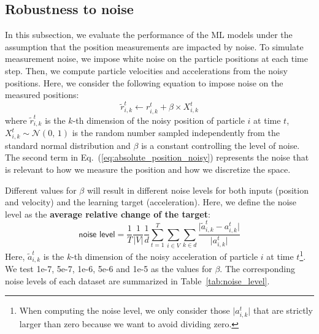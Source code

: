 \documentclass{article}
\newcommand{\abs}[1]{\lvert #1 \rvert}
\begin{document}
\clearpage







\subsection{Robustness to noise}
\label{sec:noisy_input_experiments}

In this subsection, we evaluate the performance of the ML models under the assumption that the position measurements are impacted by noise. To simulate measurement noise, we impose white noise on the particle positions at each time step. Then, we compute particle velocities and accelerations from the noisy positions. Here, we consider the following equation to impose noise on the measured positions:
\begin{equation}
\label{eq:absolute_position_noisy}
    {\tilde{r}}_{i,k}^t \leftarrow {r}_{i, k}^t + {\beta \times X_{i, k}^t}
\end{equation}
where ${\tilde{r}}_{i, k}^t$ is the $k$-th dimension of the noisy position of particle $i$ at time $t$, $X_{i, k}^t\sim \mathcal{N}(0,\,1)$ is the random number sampled independently from the standard normal distribution and $\beta$ is a constant controlling the level of noise. The second term in Eq.~(\ref{eq:absolute_position_noisy}) represents the noise that is relevant to how we measure the position and how we discretize the space.

Different values for $\beta$ will result in different noise levels for both inputs (position and velocity) and the learning target (acceleration). Here, we define the \textsf{noise level} as the \textbf{average relative change of the target}:
\begin{equation}
\label{eq:noise-level-definition}
\textsf{noise level}=
\frac{1}{T}\frac{1}{\abs{V}}\frac{1}{d} \sum_{t=1}^T\sum_{i \in V}\sum_{k \in d} \frac{\abs{{\tilde{a}}_{i,k}^t - {{a}}_{i,k}^t}}{\abs{{{a}}_{i, k}^t}}
\end{equation}
Here, ${\tilde{a}}_{i,k}^t$ is the $k$-th dimension of the noisy acceleration of particle $i$ at time $t$\footnote{When computing the \textsf{noise level}, we only consider those $\abs{{{a}}_{i, k}^t}$ that are strictly larger than zero because we want to avoid dividing zero.}. 
We test 1e-7, 5e-7, 1e-6, 5e-6 and 1e-5 as the values for $\beta$. 
The corresponding \textsf{noise levels} of each dataset are summarized in Table~\ref{tab:noise_level}.
\end{document}
